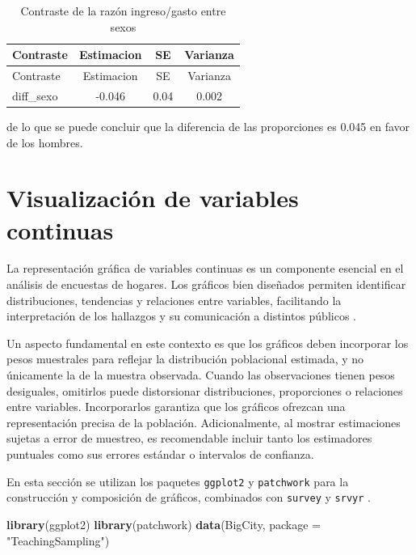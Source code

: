 \documentclass[
  spanish,
  12pt,
]{book}
\newenvironment{Shaded}{\begin{snugshade}}{\end{snugshade}}
\newcommand{\AttributeTok}[1]{\textcolor[rgb]{0.13,0.29,0.53}{#1}}
\newcommand{\FunctionTok}[1]{\textcolor[rgb]{0.13,0.29,0.53}{\textbf{#1}}}
\newcommand{\NormalTok}[1]{#1}
\newcommand{\StringTok}[1]{\textcolor[rgb]{0.31,0.60,0.02}{#1}}
\begin{document}
\begin{longtable}[]{@{}lccc@{}}
\caption{\label{tab:tab-contraste-razon-sexo}Contraste de la razón ingreso/gasto entre sexos}\tabularnewline
\toprule\noalign{}
Contraste & Estimacion & SE & Varianza \\
\midrule\noalign{}
\endfirsthead
\toprule\noalign{}
Contraste & Estimacion & SE & Varianza \\
\midrule\noalign{}
\endhead
\bottomrule\noalign{}
\endlastfoot
diff\_sexo & -0.046 & 0.04 & 0.002 \\
\end{longtable}

de lo que se puede concluir que la diferencia de las proporciones es 0.045 en favor de los hombres.

\section{Visualización de variables continuas}\label{viz-continuas}

La representación gráfica de variables continuas es un componente esencial en el análisis de encuestas de hogares. Los gráficos bien diseñados permiten identificar distribuciones, tendencias y relaciones entre variables, facilitando la interpretación de los hallazgos y su comunicación a distintos públicos \citep{wilkinson2005grammar}.

Un aspecto fundamental en este contexto es que los gráficos deben incorporar los pesos muestrales para reflejar la distribución poblacional estimada, y no únicamente la de la muestra observada. Cuando las observaciones tienen pesos desiguales, omitirlos puede distorsionar distribuciones, proporciones o relaciones entre variables. Incorporarlos garantiza que los gráficos ofrezcan una representación precisa de la población. Adicionalmente, al mostrar estimaciones sujetas a error de muestreo, es recomendable incluir tanto los estimadores puntuales como sus errores estándar o intervalos de confianza.

En esta sección se utilizan los paquetes \texttt{ggplot2} \citep{Wickham2023} y \texttt{patchwork} \citep{patchwork} para la construcción y composición de gráficos, combinados con \texttt{survey} \citep{Lumley2024} y \texttt{srvyr} \citep{Freedman2024}.

\begin{Shaded}
\begin{Highlighting}[]
\FunctionTok{library}\NormalTok{(ggplot2)}
\FunctionTok{library}\NormalTok{(patchwork)}
\FunctionTok{data}\NormalTok{(BigCity, }\AttributeTok{package =} \StringTok{"TeachingSampling"}\NormalTok{)}
\end{Highlighting}
\end{Shaded}
\end{document}
